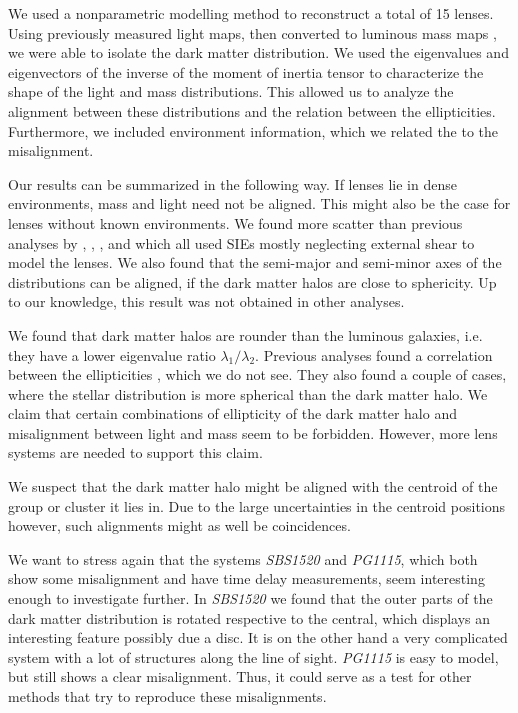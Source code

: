 \documentclass[useAMS,usenatbib]{mn2e}
\begin{document}
We used a nonparametric modelling method to reconstruct a total of 15 lenses. Using previously measured light maps, then converted to luminous mass maps \cite{leier11phd}, we were able to isolate the dark matter distribution. We used the eigenvalues and eigenvectors of the inverse of the moment of inertia tensor to characterize the shape of the light and mass distributions. This allowed us to analyze the alignment between these distributions and the relation between the ellipticities. Furthermore, we included environment information, which we related the to the misalignment.

Our results can be summarized in the following way. If lenses lie in dense environments, mass and light need not be aligned. This might also be the case for lenses without known environments. We found more scatter than previous analyses by \cite{1997ApJ...482..604K}, \cite{2006ApJ...649..599K}, \cite{2009ApJ...690..670T}, and \cite{2012ApJ...761..170G} which all used SIEs mostly neglecting external shear to model the lenses. We also found that the semi-major and semi-minor axes of the distributions can be aligned, if the dark matter halos are close to sphericity. Up to our knowledge, this result was not obtained in other analyses.

We found that dark matter halos are rounder than the luminous galaxies, i.e. they have a lower eigenvalue ratio $\lambda_{1}/\lambda_{2}$. Previous analyses found a correlation between the ellipticities \citep{2009ApJ...690..670T,2012ApJ...761..170G}, which we do not see. They also found a couple of cases, where the stellar distribution is more spherical than the dark matter halo. We claim that certain combinations of ellipticity of the dark matter halo and misalignment between light and mass seem to be forbidden. However, more lens systems are needed to support this claim.

We suspect that the dark matter halo might be aligned with the centroid of the group or cluster it lies in. Due to the large uncertainties in the centroid positions however, such alignments might as well be coincidences.

We want to stress again that the systems \textit{SBS1520} and \textit{PG1115}, which both show some misalignment and have time delay measurements, seem interesting enough to investigate further. In \textit{SBS1520} we found that the outer parts of the dark matter distribution is rotated respective to the central, which displays an interesting feature possibly due a disc. It is on the other hand a very complicated system with a lot of structures along the line of sight. \textit{PG1115} is easy to model, but still shows a clear misalignment. Thus, it could serve as a test for other methods that try to reproduce these misalignments.
\end{document}

